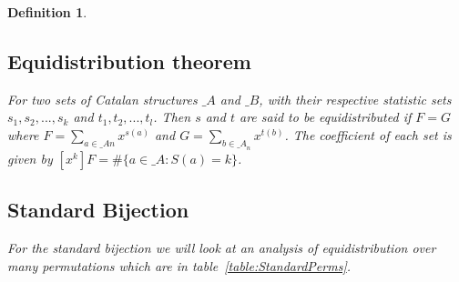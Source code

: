 \documentclass[12pt]{article}
\newtheorem{definition}{Definition}
\begin{document}
\begin{definition}
\subsection{Equidistribution theorem}
For two sets of Catalan structures $\mathcal_{A}$ and $\mathcal_{B}$, with their respective statistic sets $s_1, s_2,..., s_k$ and $t_1, t_2,...,t_l$. Then $s$ and $t$ are said to be equidistributed if $F = G$ where $F = {\sum_{a \in {\mathcal_{A}}n}} x^{s(a)}$ and $G = {\sum_{b \in {\mathcal_{A}}_n}} x^{t(b)}$. The coefficient of each set is given by $[x^k]F = \#\{a \in {\mathcal_{A}} : S(a) = k\}$.

\subsection{Standard Bijection}
For the standard bijection we will look at an analysis of equidistribution over many permutations which are in table~\ref{table:StandardPerms}. 


\end{definition}
\end{document}
